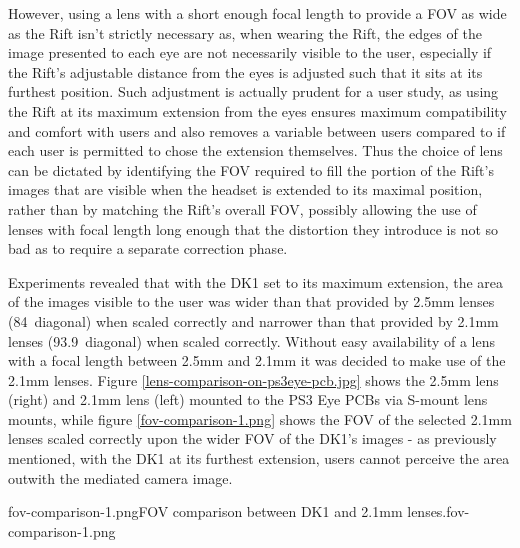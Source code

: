 However, using a lens with a short enough focal length to provide a FOV as wide as the Rift isn't strictly necessary as, when wearing the Rift, the edges of the image presented to each eye are not necessarily visible to the user, especially if the Rift's adjustable distance from the eyes is adjusted such that it sits at its furthest position. Such adjustment is actually prudent for a user study, as using the Rift at its maximum extension from the eyes ensures maximum compatibility and comfort with users and also removes a variable between users compared to if each user is permitted to chose the extension themselves. Thus the choice of lens can be dictated by identifying the FOV required to fill the portion of the Rift's images that are visible when the headset is extended to its maximal position, rather than by matching the Rift's overall FOV, possibly allowing the use of lenses with focal length long enough that the distortion they introduce is not so bad as to require a separate correction phase.

Experiments revealed that with the DK1 set to its maximum extension, the area of the images visible to the user was wider than that provided by 2.5mm lenses (84\textdegree\ diagonal) when scaled correctly and narrower than that provided by 2.1mm lenses (93.9\textdegree\ diagonal) when scaled correctly. Without easy availability of a lens with a focal length between 2.5mm and 2.1mm it was decided to make use of the 2.1mm lenses. Figure \ref{lens-comparison-on-ps3eye-pcb.jpg} shows the 2.5mm lens (right) and 2.1mm lens (left) mounted to the PS3 Eye PCBs via S-mount lens mounts, while figure \ref{fov-comparison-1.png} shows the FOV of the selected 2.1mm lenses scaled correctly upon the wider FOV of the DK1's images - as previously mentioned, with the DK1 at its furthest extension, users cannot perceive the area outwith the mediated camera image.

       {fov-comparison-1.png}{FOV comparison between DK1 and 2.1mm lenses.}{fov-comparison-1.png}


